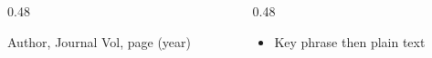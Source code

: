 \begin{frame}[t]
\par
\begin{columns}[T]
\begin{column}{0.48\textwidth}
\centering
\par
\vspace{0.1cm}
{\tiny\color{citegray} Author, Journal Vol, page (year)\par}
\end{column}
\begin{column}{0.48\textwidth}
\vspace{0.2cm}
\begin{itemize}
 \item \colorbox{tomato!30}{\mystrut Key phrase} then plain text
\end{itemize}
\end{column}
\end{columns}
\end{frame}
